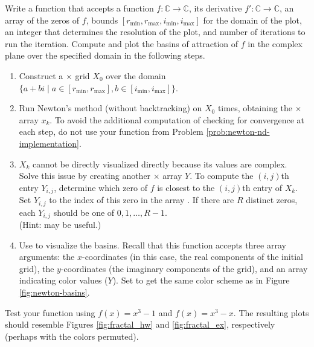 \begin{problem} %
Write a function that accepts a function $f:\mathbb{C}\rightarrow\mathbb{C}$, its derivative $f':\mathbb{C}\rightarrow\mathbb{C}$, an array  of the zeros of $f$, bounds $[r_{\text{min}},r_{\text{max}},i_{\text{min}},i_{\text{max}}]$ for the domain of the plot, an integer  that determines the resolution of the plot, and number of iterations  to run the iteration.
Compute and plot the basins of attraction of $f$ in the complex plane over the specified domain in the following steps.
\begin{enumerate}
\item Construct a $\times$ grid $X_0$ over the domain $\{a+bi \mid a \in [r_{\text{min}},r_{\text{max}}], b \in [i_{\text{min}},i_{\text{max}}]\}$.

\item Run Newton's method (without backtracking) on $X_0$  times, obtaining the $\times$ array $x_{k}$.
To avoid the additional computation of checking for convergence at each step, do not use your function from Problem \ref{prob:newton-nd-implementation}.

\item $X_k$ cannot be directly visualized directly because its values are complex.
Solve this issue by creating another $\times$ array $Y$.
To compute the $(i,j)$th entry $Y_{i,j}$, determine which zero of $f$ is closest to the $(i,j)$th entry of $X_k$.
Set $Y_{i,j}$ to the index of this zero in the array .
If there are $R$ distinct zeros, each $Y_{i,j}$ should be one of $0,1,\ldots,R-1$.
\\(Hint:  may be useful.)

\item Use  to visualize the basins.
Recall that this function accepts three array arguments: the $x$-coordinates (in this case, the real components of the initial grid), the $y$-coordinates (the imaginary components of the grid), and an array indicating color values ($Y$).
Set  to get the same color scheme as in Figure \ref{fig:newton-basins}.
\end{enumerate}

Test your function using $f(x) = x^3-1$ and $f(x)=x^3-x$.
The resulting plots should resemble Figures \ref{fig:fractal_hw} and \ref{fig:fractal_ex}, respectively (perhaps with the colors permuted).
\end{problem}

